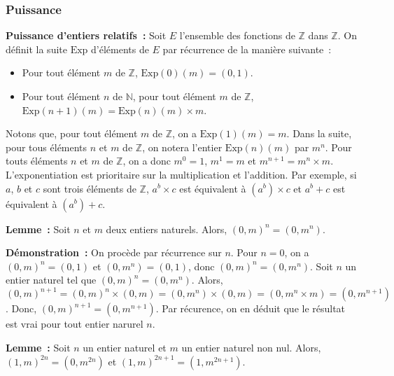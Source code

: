 \done

\subsubsection{Puissance}

\noindent\textbf{Puissance d'entiers relatifs :} Soit $E$ l'ensemble des fonctions de $\mathbb{Z}$ dans $\mathbb{Z}$. 
    On définit la suite $\mathrm{Exp}$ d'éléments de $E$ par récurrence de la manière suivante : 
    \begin{itemize}[nosep]
        \item Pour tout élément $m$ de $\mathbb{Z}$, $\mathrm{Exp}(0)(m) = (0,1)$.
        \item Pour tout élément $n$ de $\mathbb{N}$, pour tout élément $m$ de $\mathbb{Z}$, $\mathrm{Exp}(n+1)(m) = \mathrm{Exp}(n)(m) \times m$.
    \end{itemize}
    Notons que, pour tout élément $m$ de $\mathbb{Z}$, on a $\mathrm{Exp}(1)(m) = m$. 
    Dans la suite, pour tous éléments $n$ et $m$ de $\mathbb{Z}$, on notera l'entier $\mathrm{Exp}(n)(m)$ par $m^n$. 
    Pour touts éléments $n$ et $m$ de $\mathbb{Z}$, on a donc $m^0=1$, $m^1 = m$ et $m^{n+1} = m^n \times m$. 
    L'exponentiation est prioritaire sur la multiplication et l'addition. 
    Par exemple, si $a$, $b$ et $c$ sont trois éléments de $\mathbb{Z}$, $a^b \times c$ est équivalent à $(a^b) \times c$ et $a^b + c$ est équivalent à $(a^b) + c$.

\medskip

\noindent\textbf{Lemme :} Soit $n$ et $m$ deux entiers naturels. 
    Alors, $(0,m)^n = (0,m^n)$.

\medskip

\noindent\textbf{Démonstration :} On procède par récurrence sur $n$.
    Pour $n = 0$, on a $(0,m)^n = (0,1)$ et $(0,m^n) = (0,1)$, donc $(0,m)^n = (0,m^n)$.
    Soit $n$ un entier naturel tel que $(0,m)^n = (0,m^n)$. 
    Alors, $(0,m)^{n+1} = (0,m)^n \times (0,m) = (0,m^n) \times (0,m) = (0, m^n \times m) = (0, m^{n+1})$. 
    Donc, $(0,m)^{n+1} = (0,m^{n+1})$.
    Par récurence, on en déduit que le résultat est vrai pour tout entier narurel $n$.

   \done 

\medskip

\noindent\textbf{Lemme :} Soit $n$ un entier naturel et $m$ un entier naturel non nul. 
    Alors, $(1,m)^{2n} = (0,m^{2n})$ et $(1,m)^{2n+1} = (1,m^{2n+1})$.

\medskip

